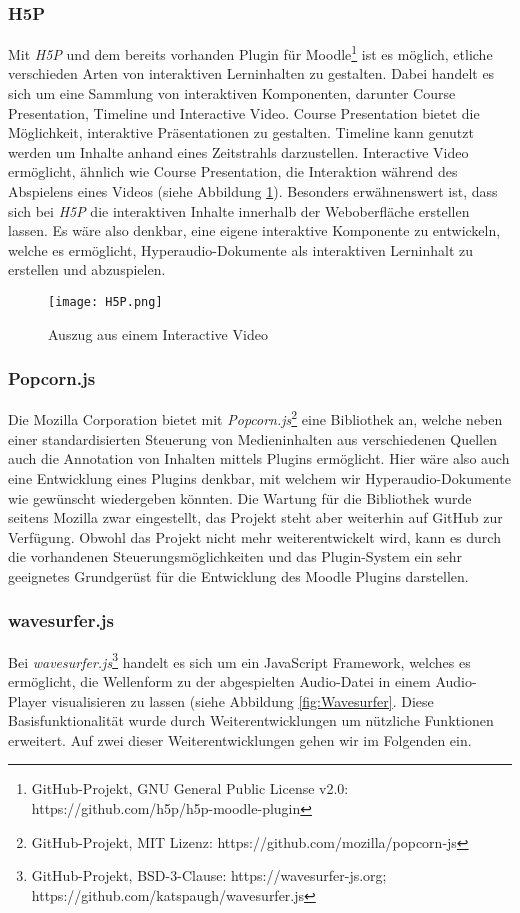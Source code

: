 \subsubsection{H5P}
Mit \textit{H5P} und dem bereits vorhanden Plugin für Moodle\footnote{GitHub-Projekt, GNU General Public License v2.0: https://github.com/h5p/h5p-moodle-plugin} ist es möglich, etliche verschieden Arten von interaktiven Lerninhalten zu gestalten. Dabei handelt es sich um eine Sammlung von interaktiven Komponenten, darunter Course Presentation, Timeline und Interactive Video. Course Presentation bietet die Möglichkeit, interaktive Präsentationen zu gestalten. Timeline kann genutzt werden um Inhalte anhand eines Zeitstrahls darzustellen. Interactive Video ermöglicht, ähnlich wie Course Presentation, die Interaktion während des Abspielens eines Videos (siehe Abbildung \ref{fig:H5P}). Besonders erwähnenswert ist, dass sich bei \textit{H5P} die interaktiven Inhalte innerhalb der Weboberfläche erstellen lassen. Es wäre also denkbar, eine eigene interaktive Komponente zu entwickeln, welche es ermöglicht, Hyperaudio-Dokumente als interaktiven Lerninhalt zu erstellen und abzuspielen.

\begin{figure}[h!]
\texttt{[image: H5P.png]}
\caption{\label{fig:H5P} Auszug aus einem Interactive Video \citep{h5p2013video}}
\end{figure}

\subsubsection{Popcorn.js}
Die Mozilla Corporation bietet mit \textit{Popcorn.js}\footnote{GitHub-Projekt, MIT Lizenz: https://github.com/mozilla/popcorn-js} eine Bibliothek an, welche neben einer standardisierten Steuerung von Medieninhalten aus verschiedenen Quellen auch die Annotation von Inhalten mittels Plugins ermöglicht. Hier wäre also auch eine Entwicklung eines Plugins denkbar, mit welchem wir Hyperaudio-Dokumente wie gewünscht wiedergeben könnten. Die Wartung für die Bibliothek wurde seitens Mozilla zwar eingestellt, das Projekt steht aber weiterhin auf GitHub zur Verfügung. Obwohl das Projekt nicht mehr weiterentwickelt wird, kann es durch die vorhandenen Steuerungsmöglichkeiten und das Plugin-System ein sehr geeignetes Grundgerüst für die Entwicklung des Moodle Plugins darstellen.
 
\subsubsection{wavesurfer.js}
\label{sec:wavesurfer.js}
Bei \textit{wavesurfer.js}\footnote{GitHub-Projekt, BSD-3-Clause: https://wavesurfer-js.org; https://github.com/katspaugh/wavesurfer.js} handelt es sich um ein JavaScript Framework, welches es ermöglicht, die Wellenform zu der abgespielten Audio-Datei in einem Audio-Player visualisieren zu lassen (siehe Abbildung \ref{fig:Wavesurfer}. Diese Basisfunktionalität wurde durch Weiterentwicklungen um nützliche Funktionen erweitert. Auf zwei dieser Weiterentwicklungen gehen wir im Folgenden ein.


